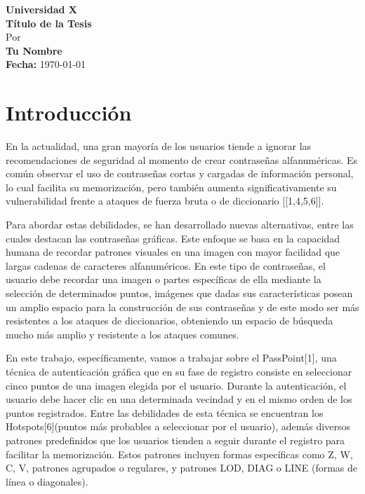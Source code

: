 \documentclass[12pt]{report}
\begin{document}
\begin{titlepage}
    \centering
    {\Large \textbf{Universidad X}}\\[2cm]
    {\Huge \textbf{Título de la Tesis}}\\[1.5cm]
    {\large Por}\\[0.5cm]
    {\Large \textbf{Tu Nombre}}\\[2cm]
   
    {\large \textbf{Fecha:} \today}
\end{titlepage}

\tableofcontents
\newpage

\chapter*{Introducción}
\hypertarget{introduccion}{}


	En la actualidad, una gran mayoría de los usuarios tiende a ignorar las recomendaciones de seguridad al momento de crear contraseñas alfanuméricas. Es común observar el uso de contraseñas cortas y cargadas de información personal, lo cual facilita su memorización, pero también aumenta significativamente su vulnerabilidad frente a ataques de fuerza bruta o de diccionario [[1,4,5,6]].
	
	Para abordar estas debilidades, se han desarrollado nuevas alternativas, entre las cuales destacan las contraseñas gráficas. Este enfoque se basa en la capacidad humana de recordar patrones visuales en una imagen con mayor facilidad que largas cadenas de caracteres alfanuméricos. En este tipo de contraseñas, el usuario debe recordar una imagen o partes específicas de ella mediante la selección  de determinados puntos, imágenes que dadas sus características posean un amplio espacio para la construcción de sus contraseñas y de este modo ser más resistentes a los ataques de diccionarios, obteniendo un espacio de búsqueda mucho más amplio y resistente a los ataques comunes.
	
	En este trabajo, específicamente, vamos a trabajar sobre el PassPoint[1], una técnica de autenticación gráfica que en su fase de registro consiste en seleccionar cinco puntos de una imagen elegida por el usuario. Durante la autenticación, el usuario debe hacer clic en una determinada vecindad y en el mismo orden de los puntos registrados. Entre las debilidades de esta técnica se encuentran los Hotspots[6](puntos más probables a seleccionar por el usuario), además diversos patrones predefinidos que los usuarios tienden a seguir durante el registro para facilitar la memorización. Estos patrones incluyen formas específicas como Z, W, C, V, patrones agrupados o regulares, y patrones LOD, DIAG o LINE (formas de línea o diagonales).
	
\end{document}
